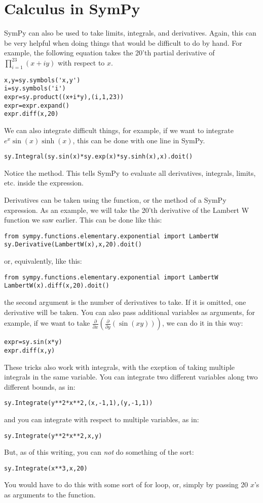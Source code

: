 \section*{Calculus in SymPy}
SymPy can also be used to take limits, integrals, and derivatives.
Again, this can be very helpful when doing things that would be difficult to do by hand.
For example, the following equation takes the 20'th partial derivative of $\displaystyle{\prod_{i=1}^{23} \left(x+i y\right)}$ with respect to $x$.
\begin{lstlisting}
x,y=sy.symbols('x,y')
i=sy.symbols('i')
expr=sy.product((x+i*y),(i,1,23))
expr=expr.expand()
expr.diff(x,20)
\end{lstlisting}

We can also integrate difficult things, for example, if we want to integrate $e^x\sin(x)\sinh(x)$, this can be done with one line in SymPy.
\begin{lstlisting}
sy.Integral(sy.sin(x)*sy.exp(x)*sy.sinh(x),x).doit()
\end{lstlisting}
Notice the  method.
This tells SymPy to evaluate all derivatives, integrals, limits, etc. inside the expression.

Derivatives can be taken using the  function, or the  method of a SymPy expression.
As an example, we will take the 20'th derivative of the Lambert W function we saw earlier.
This can be done like this:
\begin{lstlisting}
from sympy.functions.elementary.exponential import LambertW
sy.Derivative(LambertW(x),x,20).doit()
\end{lstlisting}
or, equivalently, like this:
\begin{lstlisting}
from sympy.functions.elementary.exponential import LambertW
LambertW(x).diff(x,20).doit()
\end{lstlisting}
the second argument is the number of derivatives to take.
If it is omitted, one derivative will be taken.
You can also pass additional variables as arguments, for example, if we want to take $\frac{\partial}{\partial x} \left( \frac{\partial}{\partial y}\left(\sin\left(x y\right)\right)\right)$, we can do it in this way:
\begin{lstlisting}
expr=sy.sin(x*y)
expr.diff(x,y)
\end{lstlisting}
These tricks also work with integrals, with the exeption of taking multiple integrals in the same variable.
You can integrate two different variables along two different bounds, as in:
\begin{lstlisting}
sy.Integrate(y**2*x**2,(x,-1,1),(y,-1,1))
\end{lstlisting}
and you can integrate with respect to multiple variables, as in:
\begin{lstlisting}
sy.Integrate(y**2*x**2,x,y)
\end{lstlisting}
But, as of this writing, you can \emph{not} do something of the sort:
\begin{lstlisting}
sy.Integrate(x**3,x,20)
\end{lstlisting}
You would have to do this with some sort of for loop, or, simply by passing 20 $x$'s as arguments to the function.

